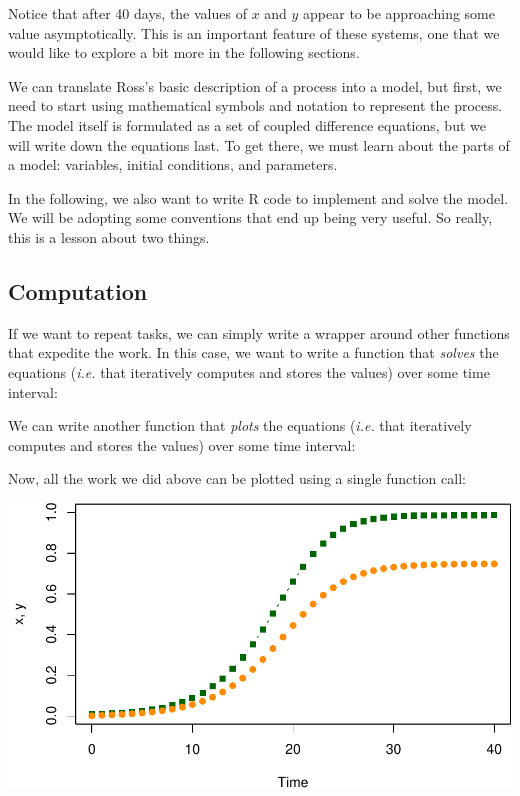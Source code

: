 \documentclass[
]{book}
\begin{document}
Notice that after 40 days, the values of \(x\) and \(y\) appear to be approaching some value asymptotically. This is an important feature of these systems, one that we would like to explore a bit more in the following sections.

We can translate Ross's basic description of a process into a model, but first, we need to start using mathematical symbols and notation to represent the process. The model itself is formulated as a set of coupled difference equations, but we will write down the equations last. To get there, we must learn about the parts of a model: variables, initial conditions, and parameters.

In the following, we also want to write R code to implement and solve the model. We will be adopting some conventions that end up being very useful. So really, this is a lesson about two things.

\subsection{Computation}\label{computation}

If we want to repeat tasks, we can simply write a wrapper around other functions that expedite the work. In this case, we want to write a function that \emph{solves} the equations (\emph{i.e.} that iteratively computes and stores the values) over some time interval:

We can write another function that \emph{plots} the equations (\emph{i.e.} that iteratively computes and stores the values) over some time interval:

Now, all the work we did above can be plotted using a single function call:

\includegraphics{docs/figs/unnamed-chunk-12-1.pdf}
\end{document}

